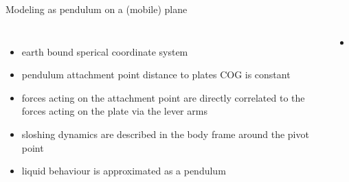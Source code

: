\documentclass[de]{sdqbeamer}
\begin{document}

\begin{frame}{Modeling as pendulum on a (mobile) plane}
    \begin{columns}
        \begin{itemize}
            \item earth bound sperical coordinate system 
            \item pendulum attachment point distance to plates COG is constant
            \item forces acting on the attachment point are directly correlated to the forces acting on the plate via the lever arms
            \item sloshing dynamics are described in the body frame around the pivot point 
            \item liquid behaviour is approximated as a pendulum
        \end{itemize}        
            \begin{itemize}
                \item
            \end{itemize}
    \end{columns}   
\end{frame}



\end{document}
